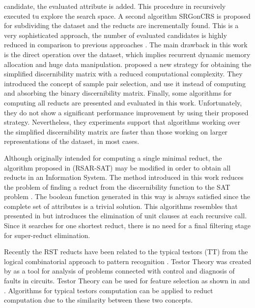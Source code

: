 \documentclass[authoryear,preprint,review,12pt]{elsarticle}
\begin{document}
  candidate, the evaluated attribute is added. This procedure in recursively executed tu explore the search
  space. A second algorithm SRGonCRS is proposed for subdividing the dataset and the reducts are incrementally
  found. This is a very sophisticated approach, the number of evaluated candidates is highly reduced in comparison
  to previous approaches \citep{Bazan2001,Ohrn00}. The main drawback in this work is the direct operation over
  the dataset, which implies recurrent dynamic memory allocation and huge data manipulation.
  \cite{Chen2012} proposed a new strategy for obtaining the simplified discernibility matrix with a reduced
  computational complexity. They introduced the concept of sample pair selection, and use it instead of computing 
  and absorbing the binary discernibility matrix. Finally, some algorithms for computing all reducts are presented
  and evaluated in this work. Unfortunately, they do not show a significant performance improvement by using their
  proposed strategy. Nevertheless, they experiments support that algorithms working over the simplified 
  discernibility matrix are faster than those working on larger representations of the dataset, in most cases.
  
  Although originally intended for computing a single minimal reduct, the algorithm proposed in \linebreak 
  \citep{Jensen14} (RSAR-SAT) may be modified in order to obtain all reducts in an Information System. 
  The method introduced in this work reduces the problem of finding a reduct from the discernibility function 
  to the SAT problem \citep{Davis62}. The boolean function generated in this way is always satisfied since the
  complete set of attributes is a trivial solution. This algorithms resembles that presented in \citep{Starzyk99}
  but introduces the elimination of unit clauses at each recursive call. Since it searches for one shortest
  reduct, there is no need for a final filtering stage for super-reduct elimination.
    
  Recently the RST reducts have been related to the typical testors (TT) from the logical combinatorial approach 
  to pattern recognition \citep{Lazo15}. Testor Theory was created by \cite{Cheguis55} as a tool for analysis of 
  problems connected with control and diagnosis of faults in circuits. 
  Testor Theory can be used for feature selection as shown in \citep{Ruiz08} and \citep{Martinez01}. 
  Algorithms for typical testors computation can be applied to reduct computation due to the similarity between
  these two concepts. 
  
\end{document}
